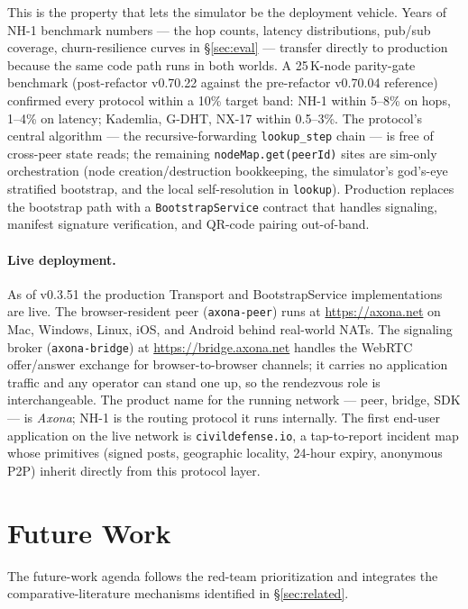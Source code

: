 \documentclass[conference]{IEEEtran}
\newcommand{\nhone}{NH-1\xspace}
\newcommand{\GDHT}{G-DHT\xspace}
\begin{document}
This is the property that lets the simulator be the deployment
vehicle. Years of \nhone benchmark numbers --- the hop counts,
latency distributions, pub/sub coverage, churn-resilience curves
in \S\ref{sec:eval} --- transfer directly to production because
the same code path runs in both worlds. A 25\,K-node parity-gate
benchmark (post-refactor v0.70.22 against the pre-refactor
v0.70.04 reference) confirmed every protocol within a 10\% target
band: \nhone within 5--8\% on hops, 1--4\% on latency; Kademlia,
\GDHT, NX-17 within 0.5--3\%. The protocol's central algorithm
--- the recursive-forwarding \texttt{lookup\_step} chain --- is
free of cross-peer state reads; the remaining
\texttt{nodeMap.get(peerId)} sites are sim-only orchestration
(node creation/destruction bookkeeping, the simulator's god's-eye
stratified bootstrap, and the local self-resolution in
\texttt{lookup}). Production replaces the bootstrap path with a
\texttt{BootstrapService} contract that handles signaling,
manifest signature verification, and QR-code pairing
out-of-band.

\paragraph{Live deployment.} As of v0.3.51 the production
Transport and BootstrapService implementations are live. The
browser-resident peer (\texttt{axona-peer}) runs at
\url{https://axona.net} on Mac, Windows, Linux, iOS, and Android
behind real-world NATs. The signaling broker
(\texttt{axona-bridge}) at \url{https://bridge.axona.net}
handles the WebRTC offer/answer exchange for browser-to-browser
channels; it carries no application traffic and any operator
can stand one up, so the rendezvous role is interchangeable.
The product name for the running network --- peer, bridge,
SDK --- is \emph{Axona}; \nhone is the routing protocol it
runs internally. The first end-user application on the live
network is \texttt{civildefense.io}, a tap-to-report incident
map whose primitives (signed posts, geographic locality,
24-hour expiry, anonymous P2P) inherit directly from this
protocol layer.

\section{Future Work}
\label{sec:future}

The future-work agenda follows the red-team prioritization
\cite{nh1redteam2026} and integrates the comparative-literature
mechanisms identified in \S\ref{sec:related}.
\end{document}
